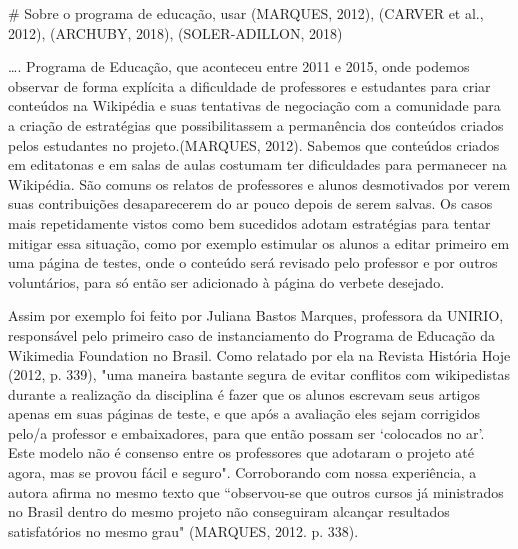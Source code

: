 # Sobre o programa de educação, usar (MARQUES, 2012), (CARVER et al., 2012), (ARCHUBY, 2018), (SOLER-ADILLON, 2018)

…. Programa de Educação, que aconteceu entre 2011 e 2015, onde podemos observar de forma explícita a dificuldade de professores e estudantes para criar conteúdos na Wikipédia e suas tentativas de negociação com a comunidade para a criação de estratégias que possibilitassem a permanência dos conteúdos criados pelos estudantes no projeto.(MARQUES, 2012).
Sabemos que conteúdos criados em editatonas e em salas de aulas costumam ter dificuldades para permanecer na Wikipédia. São comuns os relatos de professores e alunos desmotivados por verem suas contribuições desaparecerem do ar pouco depois de serem salvas. Os casos mais repetidamente vistos como bem sucedidos adotam estratégias para tentar mitigar essa situação, como por exemplo estimular os alunos a editar primeiro em uma página de testes, onde o conteúdo será revisado pelo professor e por outros voluntários, para só então ser adicionado à página do verbete desejado. 

Assim por exemplo foi feito por Juliana Bastos Marques, professora da UNIRIO, responsável pelo primeiro caso de instanciamento do Programa de Educação da Wikimedia Foundation no Brasil. Como relatado por ela na Revista História Hoje (2012, p. 339), "uma maneira bastante segura de evitar conflitos com wikipedistas durante a realização da disciplina é fazer que os alunos escrevam seus artigos apenas em suas páginas de teste, e que após a avaliação eles sejam corrigidos pelo/a professor e embaixadores, para que então possam ser ‘colocados no ar’. Este modelo não é consenso entre os professores que adotaram o projeto até agora, mas se provou fácil e seguro". Corroborando com nossa experiência, a autora afirma no mesmo texto que “observou-se que outros cursos já ministrados no Brasil dentro do mesmo projeto não conseguiram alcançar resultados satisfatórios no mesmo grau" (MARQUES, 2012. p. 338).

